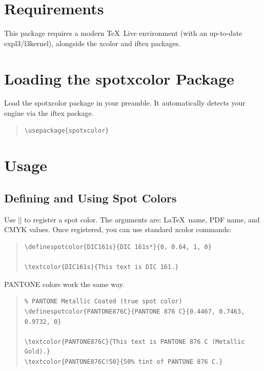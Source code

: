 \documentclass[luatex]{article}\listfiles
\begin{document}
\section{Requirements}
This package requires a modern \TeX\ Live environment (with an up-to-date \textsf{expl3}/\textsf{l3kernel}), alongside the \textsf{xcolor} and \textsf{iftex} packages.

\section{Loading the \textsf{spotxcolor} Package}

Load the \textsf{spotxcolor} package in your preamble. It automatically detects your engine via the \textsf{iftex} package.

\begin{quote}
\begin{verbatim}
\usepackage{spotxcolor}
\end{verbatim}
\end{quote}

\section{Usage}

\subsection{Defining and Using Spot Colors}
Use || to register a spot color.
The arguments are: \LaTeX\ name, PDF name, and CMYK values.
Once registered, you can use standard \textsf{xcolor} commands:

\begin{quote}
\begin{verbatim}
\definespotcolor{DIC161s}{DIC 161s*}{0, 0.64, 1, 0}

\textcolor{DIC161s}{This text is DIC 161.}
\end{verbatim}
\end{quote}

\noindent PANTONE colors work the same way.

\begin{quote}
\begin{verbatim}
% PANTONE Metallic Coated (true spot color)
\definespotcolor{PANTONE876C}{PANTONE 876 C}{0.4467, 0.7463, 0.9732, 0}

\textcolor{PANTONE876C}{This text is PANTONE 876 C (Metallic Gold).}
\textcolor{PANTONE876C!50}{50% tint of PANTONE 876 C.}
\end{verbatim}
\end{quote}
\end{document}
